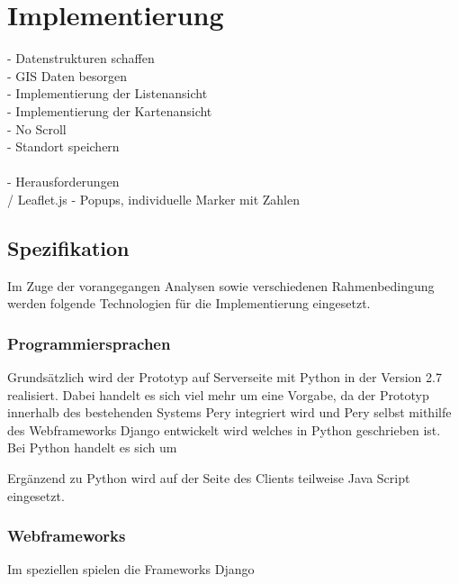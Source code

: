 \documentclass[Bachelorarbeit.tex]{subfiles}
\begin{document}
\chapter{Implementierung}
\label{chap:implementierung}


 - Datenstrukturen schaffen\\
 - GIS Daten besorgen\\
 - Implementierung der Listenansicht\\
 - Implementierung der Kartenansicht\\
 - No Scroll\\
 - Standort speichern\\
 \\
 - Herausforderungen\\
 / Leaflet.js - Popups, individuelle Marker mit Zahlen


\section{Spezifikation}
\label{chap:implementierung:sec:spezifikation}
Im Zuge der vorangegangen Analysen sowie verschiedenen Rahmenbedingung werden folgende Technologien für die Implementierung eingesetzt. 

\subsection*{Programmiersprachen}
Grundsätzlich wird der Prototyp auf Serverseite mit Python in der Version 2.7 realisiert. 
Dabei handelt es sich viel mehr um eine Vorgabe, da der Prototyp innerhalb des bestehenden Systems Pery integriert wird und Pery selbst mithilfe des Webframeworks Django entwickelt wird welches in Python geschrieben ist.
Bei Python handelt es sich um 

Ergänzend zu Python wird auf der Seite des Clients teilweise Java Script eingesetzt. 

\subsection*{Webframeworks}
Im speziellen spielen die Frameworks Django 
\end{document}
